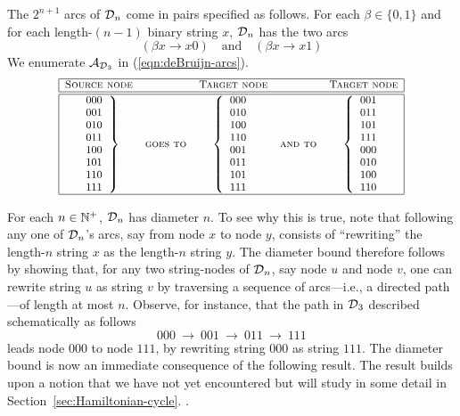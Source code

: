 The $2^{n+1}$ arcs of $\mbox{$\cal D$}_n$ come in pairs specified as follows.  For
each $\beta \in \{0,1\}$ and for each length-$(n-1)$ binary string
$x$, $\mbox{$\cal D$}_n$ has the two arcs
\[ (\beta x \rightarrow x0) \ \ \ \mbox{ and } \ \ \ 
(\beta x \rightarrow x1)
\]
We enumerate $\mbox{$\cal A$}_{\mbox{{\scriptsize $\cal D$}}_3}$ in (\ref{eqn:deBruijn-arcs}).
\begin{equation}
\label{eqn:deBruijn-arcs}
{\small
\begin{array}{|ccccc|}
\hline
\mbox{\sc Source node} & & \mbox{\sc Target node} & & \mbox{\sc Target node} \\
\hline \hline
{\displaystyle
\left.
\begin{array}{c}
000 \\
001 \\
010 \\
011 \\
100 \\
101 \\
110 \\
111
\end{array}
\right\}
} &
\mbox{\sc goes to} 
  &
{\displaystyle
\left\{
\begin{array}{c}
000 \\
010 \\
100 \\
110 \\
001 \\
011 \\
101 \\
111
\end{array}
\right.
}
  &
\mbox{\sc and to}
  &
{\displaystyle
\left\{
\begin{array}{c}
001 \\
011 \\
101 \\
111 \\
000 \\
010 \\
100 \\
110
\end{array} 
\right.
}
 \\
\hline
\end{array}
}
\end{equation}

For each $n \in \mathbb{N}^+$, $\mbox{$\cal D$}_n$ has diameter $n$.  To see why this is
true, note that following any one of $\mbox{$\cal D$}_n$'s arcs, say from node $x$
to node $y$, consists of ``rewriting'' the length-$n$ string $x$ as
the length-$n$ string $y$.  The diameter bound therefore follows by
showing that, for any two string-nodes of $\mbox{$\cal D$}_n$, say node $u$ and
node $v$, one can rewrite string $u$ as string $v$ by traversing a
sequence of arcs---i.e., a directed path---of length at most $n$.
Observe, for instance, that the path in $\mbox{$\cal D$}_3$ described schematically
as follows
\[ 000 \ \rightarrow \ 001 \ \rightarrow \ 011 \ \rightarrow \ 111 \]
leads node $000$ to node $111$, by rewriting string $000$ as string
$111$.  The diameter bound is now an immediate consequence of the
following result.  The result builds upon a notion that we have not
yet encountered but will study in some detail in
Section~\ref{sec:Hamiltonian-cycle}.
 .

